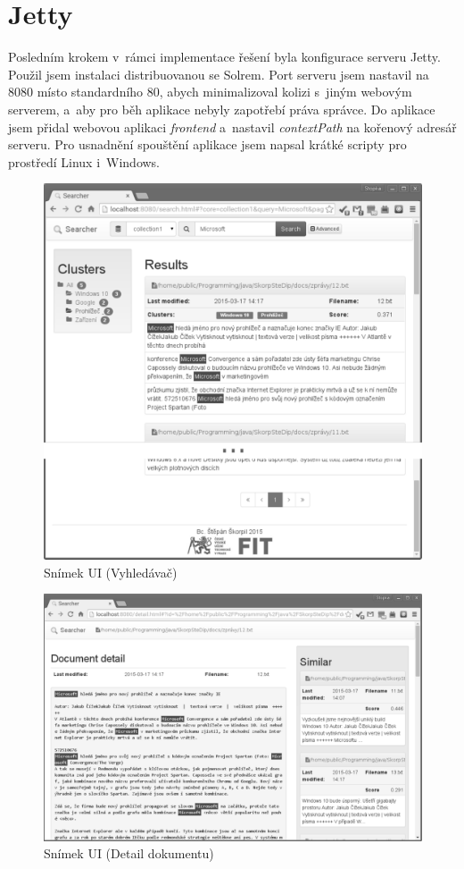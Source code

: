 \section{Jetty}
Posledním krokem v~rámci implementace řešení byla konfigurace serveru Jetty. Použil jsem instalaci distribuovanou se Solrem. Port serveru jsem nastavil na 8080 místo standardního 80, abych minimalizoval kolizi s~jiným webovým serverem, a~aby pro běh aplikace nebyly zapotřebí práva správce. Do aplikace jsem přidal webovou aplikaci \emph{frontend} a~nastavil \emph{contextPath} na kořenový adresář serveru. Pro usnadnění spouštění aplikace jsem napsal krátké scripty pro prostředí Linux i~Windows.

\begin{figure}[h]
\begin{center}
\includegraphics[width=13cm]{ScreenSearcher}
\caption{Snímek UI (Vyhledávač)}
\label{fig:ScreenSearcher}
\end{center}
\end{figure}

\begin{figure}[h]
\begin{center}
\includegraphics[width=13cm]{ScreenDetail}
\caption{Snímek UI (Detail dokumentu)}
\label{fig:ScreenDetail}
\end{center}
\end{figure}